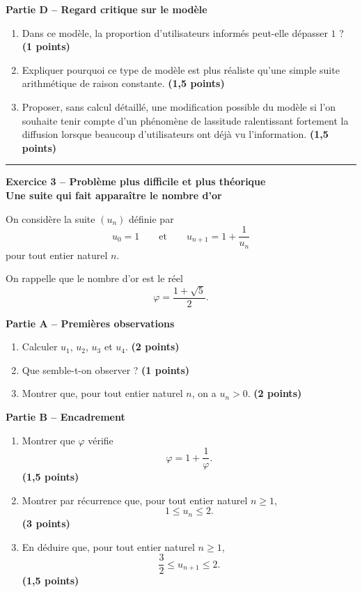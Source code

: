 \documentclass[11pt,a4paper]{article}
\newcommand{\bareme}[1]{\hfill{\color{blue!70!black}\textbf{(#1 points)}}}
\begin{document}
\medskip

\textbf{Partie D -- Regard critique sur le modèle}

\begin{enumerate}[label=\textbf{D.\arabic*.}, leftmargin=0.9cm]
    \item Dans ce modèle, la proportion d’utilisateurs informés peut-elle dépasser $1$ ? \bareme{1}
    \item Expliquer pourquoi ce type de modèle est plus réaliste qu’une simple suite arithmétique de raison constante. \bareme{1,5}
    \item Proposer, sans calcul détaillé, une modification possible du modèle si l’on souhaite tenir compte d’un phénomène de lassitude ralentissant fortement la diffusion lorsque beaucoup d’utilisateurs ont déjà vu l’information. \bareme{1,5}
\end{enumerate}

\vspace{0.4cm}
\hrule
\vspace{0.4cm}
\newpage
\begin{center}
    \textbf{\large Exercice 3 -- Problème plus difficile et plus théorique}\\
    \textbf{Une suite qui fait apparaître le nombre d’or}
\end{center}

On considère la suite $(u_n)$ définie par
\[
u_0=1
\qquad \text{et} \qquad
u_{n+1}=1+\frac{1}{u_n}
\]
pour tout entier naturel $n$.

On rappelle que le nombre d’or est le réel
\[
\varphi=\frac{1+\sqrt{5}}{2}.
\]

\medskip

\textbf{Partie A -- Premières observations}

\begin{enumerate}[label=\textbf{A.\arabic*.}, leftmargin=0.9cm]
    \item Calculer $u_1$, $u_2$, $u_3$ et $u_4$. \bareme{2}
    \item Que semble-t-on observer ? \bareme{1}
    \item Montrer que, pour tout entier naturel $n$, on a $u_n>0$. \bareme{2}
\end{enumerate}

\medskip

\textbf{Partie B -- Encadrement}

\begin{enumerate}[label=\textbf{B.\arabic*.}, leftmargin=0.9cm]
    \item Montrer que $\varphi$ vérifie
    \[
    \varphi=1+\frac{1}{\varphi}.
    \]
    \bareme{1,5}
    \item Montrer par récurrence que, pour tout entier naturel $n\geq 1$,
    \[
    1\leq u_n\leq 2.
    \]
    \bareme{3}
    \item En déduire que, pour tout entier naturel $n\geq 1$,
    \[
    \frac{3}{2}\leq u_{n+1}\leq 2.
    \]
    \bareme{1,5}
\end{enumerate}
\end{document}
